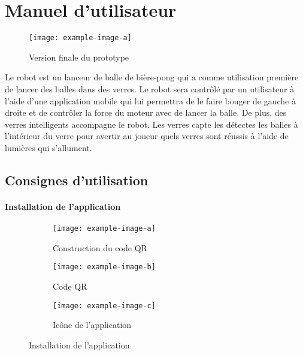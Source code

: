 \section{Manuel d’utilisateur}



\begin{wrapfigure}{r}{0.25\linewidth}
    \centering
    \texttt{[image: example-image-a]}
    \caption{Version finale du prototype}
    \label{fig:a1-protoype}
\end{wrapfigure}

Le robot est un lanceur de balle de bière-pong qui a comme utilisation première de lancer des balles dans des verres.
Le robot sera contrôlé par un utilisateur à l’aide d’une application mobile qui lui permettra de le faire bouger de gauche à droite et de contrôler la force du moteur avec de lancer la balle.
De plus, des verres intelligents accompagne le robot.
Les verres capte les détectes les balles à l’intérieur du verre pour avertir au joueur quels verres sont réussis à l’aide de lumières qui s’allument.

\subsection{Consignes d'utilisation}

\paragraph{Installation de l’application}

\begin{wrapfigure}{r}{0.5\linewidth}
    \centering

    \begin{subfigure}{.8\linewidth}
        \centering
        \texttt{[image: example-image-a]}
        \caption{Construction du code QR}
        \label{fig:a1-create-code-QR}
    \end{subfigure}
    \begin{subfigure}{0.4\linewidth}
        \centering
        \texttt{[image: example-image-b]}
        \caption{Code QR}
        \label{fig:a1-code-QR}
    \end{subfigure}
    \begin{subfigure}{0.4\linewidth}
        \centering
        \texttt{[image: example-image-c]}
        \caption{Icône de l’application}
        \label{fig:a1-app-icon}
    \end{subfigure}

    \caption{Installation de l’application}
    \label{fig:template-example-flottante}
\end{wrapfigure}


